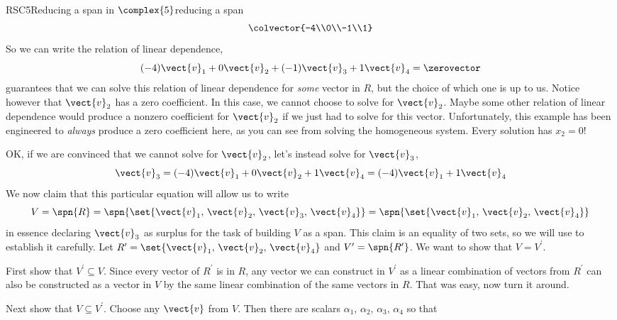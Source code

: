 \begin{example}{RSC5}{Reducing a span in $\complex{5}$}{reducing a span}
%
\begin{equation*}
\colvector{-4\\0\\-1\\1}
\end{equation*}
%
So we can write the relation of linear dependence,
%
\begin{equation*}
(-4)\vect{v}_1+0\vect{v}_2+(-1)\vect{v}_3+1\vect{v}_4=\zerovector
\end{equation*}
%
 guarantees that we can solve this relation of linear dependence for {\em some} vector in $R$, but the choice of which one is up to us.  Notice however that $\vect{v}_2$ has a zero coefficient.  In this case, we cannot choose to solve for $\vect{v}_2$.  Maybe some other relation of linear dependence would produce a nonzero coefficient for $\vect{v}_2$ if we just had to solve for this vector.  Unfortunately, this example has been engineered to {\em always} produce a zero coefficient here, as you can see from solving the homogeneous system.  Every solution has $x_2=0$!\par
%
OK, if we are convinced that we cannot solve for $\vect{v}_2$, let's instead solve for $\vect{v}_3$,
%
\begin{equation*}
\vect{v}_3=(-4)\vect{v}_1+0\vect{v}_2+1\vect{v}_4=(-4)\vect{v}_1+1\vect{v}_4
\end{equation*}
%
We now claim that this particular equation will allow us to write
%
\begin{equation*}
V=\spn{R}=
\spn{\set{\vect{v}_1,\,\vect{v}_2,\,\vect{v}_3,\,\vect{v}_4}}=
\spn{\set{\vect{v}_1,\,\vect{v}_2,\,\vect{v}_4}}
\end{equation*}
%
in essence declaring $\vect{v}_3$ as surplus for the task of building $V$ as a span.  This claim is an equality of two sets, so we will use  to establish it carefully.  Let $R^\prime=\set{\vect{v}_1,\,\vect{v}_2,\,\vect{v}_4}$ and $V^\prime=\spn{R^\prime}$.  We want to show that $V=V^\prime$.\par
%
First show that $V^\prime\subseteq V$.  Since every vector of $R^\prime$ is in $R$, any vector we can construct in $V^\prime$ as a linear combination of vectors from $R^\prime$ can also be constructed as a vector in $V$ by the same linear combination of the same vectors in $R$.  That was easy, now turn it around.\par
%
Next show that $V\subseteq V^\prime$.  Choose any $\vect{v}$ from $V$.  Then there are scalars $\alpha_1,\,\alpha_2,\,\alpha_3,\,\alpha_4$ so that

\end{example}
